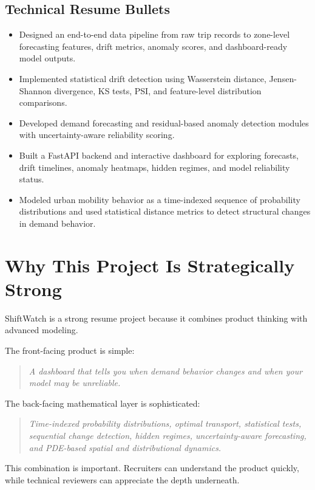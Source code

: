 \documentclass[11pt]{article}
\begin{document}
\subsection{Technical Resume Bullets}

\begin{itemize}
    \item Designed an end-to-end data pipeline from raw trip records to zone-level forecasting features, drift metrics, anomaly scores, and dashboard-ready model outputs.
    \item Implemented statistical drift detection using Wasserstein distance, Jensen-Shannon divergence, KS tests, PSI, and feature-level distribution comparisons.
    \item Developed demand forecasting and residual-based anomaly detection modules with uncertainty-aware reliability scoring.
    \item Built a FastAPI backend and interactive dashboard for exploring forecasts, drift timelines, anomaly heatmaps, hidden regimes, and model reliability status.
    \item Modeled urban mobility behavior as a time-indexed sequence of probability distributions and used statistical distance metrics to detect structural changes in demand behavior.
\end{itemize}

\section{Why This Project Is Strategically Strong}

ShiftWatch is a strong resume project because it combines product thinking with advanced modeling.

The front-facing product is simple:

\begin{quote}
    \textit{A dashboard that tells you when demand behavior changes and when your model may be unreliable.}
\end{quote}

The back-facing mathematical layer is sophisticated:

\begin{quote}
    \textit{Time-indexed probability distributions, optimal transport, statistical tests, sequential change detection, hidden regimes, uncertainty-aware forecasting, and PDE-based spatial and distributional dynamics.}
\end{quote}

This combination is important. Recruiters can understand the product quickly, while technical reviewers can appreciate the depth underneath.
\end{document}

